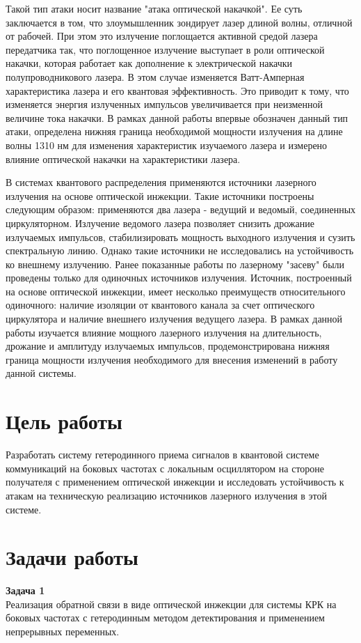 Такой тип атаки носит название "атака оптической накачкой". Ее суть заключается в том, что злоумышленник зондирует лазер длиной волны, отличной от рабочей. При этом это излучение поглощается активной средой лазера передатчика так, что поглощенное излучение выступает в роли оптической накачки, которая работает как дополнение к электрической накачки полупроводникового лазера. В этом случае изменяется Ватт-Амперная характеристика лазера и его квантовая эффективность. Это приводит к тому, что изменяется энергия излученных импульсов увеличивается при неизменной величине тока накачки. В рамках данной работы впервые обозначен данный тип атаки, определена нижняя граница необходимой мощности излучения на длине волны 1310 нм для изменения характеристик изучаемого лазера и измерено влияние оптической накачки на характеристики лазера. 

В системах квантового распределения применяются источники лазерного излучения на основе оптической инжекции. Такие источники построены следующим образом: применяются два лазера - ведущий и ведомый, соединенных циркуляторном. Излучение ведомого лазера позволяет снизить дрожание излучаемых импульсов, стабилизировать мощность выходного излучения и сузить спектральную линию. Однако такие источники не исследовались на устойчивость ко внешнему излучению. Ранее показанные работы по лазерному "засеву" были проведены только для одиночных источников излучения. Источник, построенный на основе оптической инжекции, имеет несколько преимуществ относительного одиночного: наличие изоляции от квантового канала за счет оптического циркулятора и наличие внешнего излучения ведущего лазера. В рамках данной работы изучается влияние мощного лазерного излучения на длительность, дрожание и амплитуду излучаемых импульсов, продемонстрирована нижняя граница мощности излучения необходимого  для внесения изменений в работу данной системы.
\section*{Цель работы}
Разработать систему гетеродинного приема сигналов в квантовой системе коммуникаций на боковых частотах с локальным осциллятором на стороне получателя с применением оптической инжекции и исследовать устойчивость к атакам на техническую реализацию источников лазерного излучения в этой системе. 

\section*{Задачи работы}
\textbf{Задача 1}\\
Реализация обратной связи в виде оптической инжекции для системы КРК на боковых частотах с гетеродинным методом детектирования и применением непрерывных переменных. 

